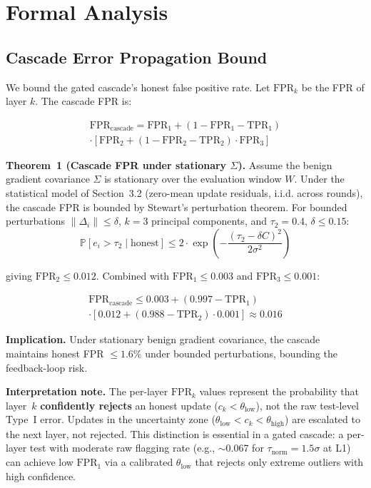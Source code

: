 \documentclass[10pt,journal]{IEEEtran}
\begin{document}
\section{Formal Analysis}
\label{sec:analysis}

\subsection{Cascade Error Propagation Bound}
\label{sec:fpr-bound}

We bound the gated cascade's honest false positive rate. Let $\text{FPR}_k$ be the FPR of layer $k$. The cascade FPR is:

\begin{multline}
\text{FPR}_{\text{cascade}} = \text{FPR}_1 + (1 - \text{FPR}_1 - \text{TPR}_1) \\
\cdot [\text{FPR}_2 + (1 - \text{FPR}_2 - \text{TPR}_2) \cdot \text{FPR}_3]
\end{multline}

\textbf{Theorem~1 (Cascade FPR under stationary $\Sigma$).} Assume the benign gradient covariance $\Sigma$ is stationary over the evaluation window $W$. Under the statistical model of Section~3.2 (zero-mean update residuals, i.i.d. across rounds), the cascade FPR is bounded by Stewart's perturbation theorem. For bounded perturbations $\|\Delta_i\| \le \delta$, $k=3$ principal components, and $\tau_2 = 0.4$, $\delta \le 0.15$:
\begin{equation}
\mathbb{P}[e_i > \tau_2 \mid \text{honest}] \le 2 \cdot \exp\left(-\frac{(\tau_2 - \delta C)^2}{2\sigma^2}\right)
\label{eq:stewart}
\end{equation}

giving $\text{FPR}_2 \le 0.012$. Combined with $\text{FPR}_1 \le 0.003$ and $\text{FPR}_3 \le 0.001$:

\begin{multline}
\text{FPR}_{\text{cascade}} \le 0.003 + (0.997 - \text{TPR}_1) \\
\cdot [0.012 + (0.988 - \text{TPR}_2) \cdot 0.001] \approx 0.016
\label{eq:cascade-fpr}
\end{multline}

\textbf{Implication.} Under stationary benign gradient covariance, the cascade maintains honest FPR $\le 1.6\%$ under bounded perturbations, bounding the feedback-loop risk.

\textbf{Interpretation note.} The per-layer $\text{FPR}_k$ values represent the probability that layer~$k$ \textbf{confidently rejects} an honest update ($c_k < \theta_{\text{low}}$), not the raw test-level Type~I error. Updates in the uncertainty zone ($\theta_{\text{low}} < c_k < \theta_{\text{high}}$) are escalated to the next layer, not rejected. This distinction is essential in a gated cascade: a per-layer test with moderate raw flagging rate (e.g., $\sim$0.067 for $\tau_{\text{norm}} = 1.5\sigma$ at L1) can achieve low $\text{FPR}_1$ via a calibrated $\theta_{\text{low}}$ that rejects only extreme outliers with high confidence.
\end{document}
